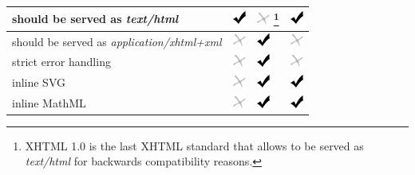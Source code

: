 \documentclass[a4paper,12pt]{sphinxmanual}
\begin{document}
\begin{tabulary}{\linewidth}{|p{9cm}|p{2cm}|p{2cm}|p{2cm}|}
should be served as \emph{text/html}
 & 
\includegraphics{yes.png}
 & 
\includegraphics{no.png} \footnote{
XHTML 1.0 is the last XHTML standard that allows to be served
as \emph{text/html} for backwards compatibility reasons.
}
 & 
\includegraphics{yes.png}
\\\hline

should be served as
\emph{application/xhtml+xml}
 & 
\includegraphics{no.png}
 & 
\includegraphics{yes.png}
 & 
\includegraphics{no.png}
\\\hline

strict error handling
 & 
\includegraphics{no.png}
 & 
\includegraphics{yes.png}
 & 
\includegraphics{no.png}
\\\hline

inline SVG
 & 
\includegraphics{no.png}
 & 
\includegraphics{yes.png}
 & 
\includegraphics{yes.png}
\\\hline

inline MathML
 & 
\includegraphics{no.png}
 & 
\includegraphics{yes.png}
 & 
\includegraphics{yes.png}
\\\hline


\end{tabulary}
\end{document}
